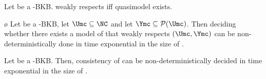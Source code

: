\begin{definition}
  
\end{definition}

\begin{definition}
  
\end{definition}

\begin{definition}
  
\end{definition}

\begin{definition}[Quasimodel]
  
\end{definition}

\begin{lemma}
  Let \Bmf be a \SHOIQ-BKB. weakly respects iff quasimodel exists.
\end{lemma}

\begin{theorem}\label{thm:shoiq-bkb-consistency-nexptime}ø
  Let \Bmf be a \SHOIQ-BKB, let $\Umc \subseteq \NC$ and let $\Ymc\subseteq\powerset{\Umc}$. Then
  deciding whether there exists a model of \Bmf that weakly respects $(\Umc,\Ymc)$ can be
  non-deterministically done in time exponential in the size of \Bmf.
\end{theorem}

\begin{corollary}
  Let \Bmf be a \SHOIQ-BKB. Then, consistency of \Bmf can be non-deterministically decided in time
  exponential in the size of \Bmf.
\end{corollary}


